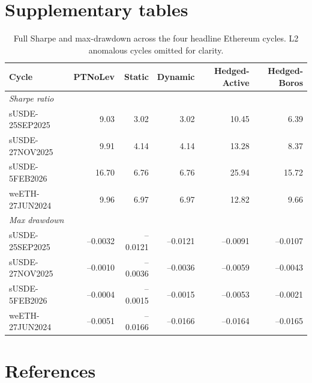 \documentclass[11pt,a4paper]{article}
\begin{document}
\section{Supplementary tables}
\label{sec:supp}

\begin{table}[ht]
\centering
\footnotesize
\begin{tabular}{lrrrrr}
\toprule
Cycle & PTNoLev & Static & Dynamic & Hedged-Active & Hedged-Boros \\
\midrule
\multicolumn{6}{l}{\emph{Sharpe ratio}} \\
\midrule
sUSDE-25SEP2025                    &  9.03 &  3.02 &  3.02 & 10.45 &  6.39 \\
sUSDE-27NOV2025                    &  9.91 &  4.14 &  4.14 & 13.28 &  8.37 \\
sUSDE-5FEB2026                     & 16.70 &  6.76 &  6.76 & 25.94 & 15.72 \\
weETH-27JUN2024                    &  9.96 &  6.97 &  6.97 & 12.82 &  9.66 \\
\midrule
\multicolumn{6}{l}{\emph{Max drawdown}} \\
\midrule
sUSDE-25SEP2025                    & --0.0032 & --0.0121 & --0.0121 & --0.0091 & --0.0107 \\
sUSDE-27NOV2025                    & --0.0010 & --0.0036 & --0.0036 & --0.0059 & --0.0043 \\
sUSDE-5FEB2026                     & --0.0004 & --0.0015 & --0.0015 & --0.0053 & --0.0021 \\
weETH-27JUN2024                    & --0.0051 & --0.0166 & --0.0166 & --0.0164 & --0.0165 \\
\bottomrule
\end{tabular}
\caption{Full Sharpe and max-drawdown across the four headline
Ethereum cycles. L2 anomalous cycles omitted for clarity.}
\label{tab:supp}
\end{table}

\section{References}
\end{document}
